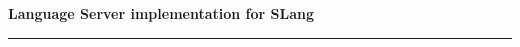 \newpage
\thispagestyle{empty}

\mbox{}

\vspace{7cm}

\begin{flushright}

\textbf{\LARGE Language Server implementation for SLang}

\vspace{0.1cm}

\rule{\linewidth}{0.15cm}%
\end{flushright}

